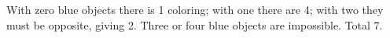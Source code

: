 With zero blue objects there is 1 coloring; with one there are 4; with two they must be opposite, giving 2. Three or four blue objects are impossible. Total $\boxed7$.
